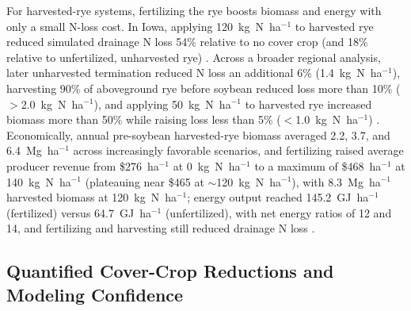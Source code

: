 \documentclass[11pt]{article}
\begin{document}
For harvested-rye systems, fertilizing the rye boosts biomass and energy with only a small N-loss cost. In Iowa, applying 120~kg~N~ha$^{-1}$ to harvested rye reduced simulated drainage N loss 54\% relative to no cover crop (and 18\% relative to unfertilized, unharvested rye) \parencite{Malone2018}. Across a broader regional analysis, later unharvested termination reduced N loss an additional 6\% (1.4~kg~N~ha$^{-1}$), harvesting 90\% of aboveground rye before soybean reduced loss more than 10\% ($>$2.0~kg~N~ha$^{-1}$), and applying 50~kg~N~ha$^{-1}$ to harvested rye increased biomass more than 50\% while raising loss less than 5\% ($<$1.0~kg~N~ha$^{-1}$) \parencite{Malone2023}. Economically, annual pre-soybean harvested-rye biomass averaged 2.2, 3.7, and 6.4~Mg~ha$^{-1}$ across increasingly favorable scenarios, and fertilizing raised average producer revenue from \$276~ha$^{-1}$ at 0~kg~N~ha$^{-1}$ to a maximum of \$468~ha$^{-1}$ at 140~kg~N~ha$^{-1}$ (plateauing near \$465 at $\sim$120~kg~N~ha$^{-1}$), with 8.3~Mg~ha$^{-1}$ harvested biomass at 120~kg~N~ha$^{-1}$; energy output reached 145.2~GJ~ha$^{-1}$ (fertilized) versus 64.7~GJ~ha$^{-1}$ (unfertilized), with net energy ratios of 12 and 14, and fertilizing and harvesting still reduced drainage N loss \parencite{Malone2018}.

\subsection{Quantified Cover-Crop Reductions and Modeling Confidence}
\end{document}
